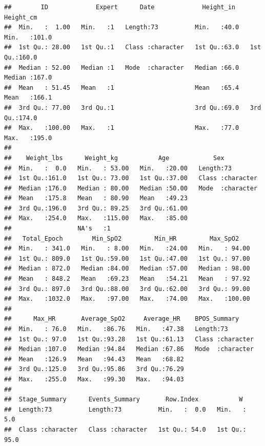 \documentclass[
]{article}
\begin{document}
\begin{verbatim}
##        ID             Expert      Date             Height_in      Height_cm    
##  Min.   :  1.00   Min.   :1   Length:73          Min.   :40.0   Min.   :101.0  
##  1st Qu.: 28.00   1st Qu.:1   Class :character   1st Qu.:63.0   1st Qu.:160.0  
##  Median : 52.00   Median :1   Mode  :character   Median :66.0   Median :167.0  
##  Mean   : 51.45   Mean   :1                      Mean   :65.4   Mean   :166.1  
##  3rd Qu.: 77.00   3rd Qu.:1                      3rd Qu.:69.0   3rd Qu.:174.0  
##  Max.   :100.00   Max.   :1                      Max.   :77.0   Max.   :195.0  
##                                                                                
##    Weight_lbs      Weight_kg           Age            Sex           
##  Min.   :  0.0   Min.   : 53.00   Min.   :20.00   Length:73         
##  1st Qu.:161.0   1st Qu.: 73.00   1st Qu.:37.00   Class :character  
##  Median :176.0   Median : 80.00   Median :50.00   Mode  :character  
##  Mean   :175.8   Mean   : 80.90   Mean   :49.23                     
##  3rd Qu.:196.0   3rd Qu.: 89.25   3rd Qu.:61.00                     
##  Max.   :254.0   Max.   :115.00   Max.   :85.00                     
##                  NA's   :1                                          
##   Total_Epoch        Min_SpO2         Min_HR         Max_SpO2     
##  Min.   : 341.0   Min.   : 8.00   Min.   :24.00   Min.   : 94.00  
##  1st Qu.: 809.0   1st Qu.:59.00   1st Qu.:47.00   1st Qu.: 97.00  
##  Median : 872.0   Median :84.00   Median :57.00   Median : 98.00  
##  Mean   : 848.2   Mean   :69.23   Mean   :54.21   Mean   : 97.92  
##  3rd Qu.: 897.0   3rd Qu.:88.00   3rd Qu.:62.00   3rd Qu.: 99.00  
##  Max.   :1032.0   Max.   :97.00   Max.   :74.00   Max.   :100.00  
##                                                                   
##      Max_HR       Average_SpO2     Average_HR    BPOS_Summary      
##  Min.   : 76.0   Min.   :86.76   Min.   :47.38   Length:73         
##  1st Qu.: 97.0   1st Qu.:93.28   1st Qu.:61.13   Class :character  
##  Median :107.0   Median :94.84   Median :67.86   Mode  :character  
##  Mean   :126.9   Mean   :94.43   Mean   :68.82                     
##  3rd Qu.:125.0   3rd Qu.:95.86   3rd Qu.:76.29                     
##  Max.   :255.0   Max.   :99.30   Max.   :94.03                     
##                                                                    
##  Stage_Summary      Events_Summary       Row.Index           W        
##  Length:73          Length:73          Min.   :  0.0   Min.   :  5.0  
##  Class :character   Class :character   1st Qu.: 54.0   1st Qu.: 95.0  

\end{verbatim}
\end{document}
